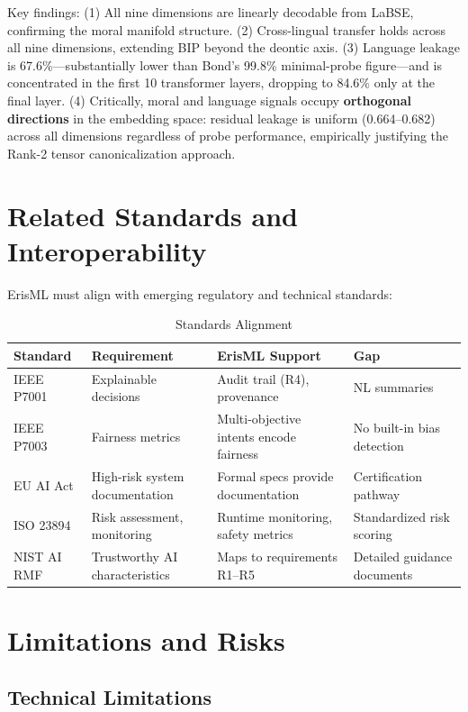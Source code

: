 \documentclass[conference]{IEEEtran}
\begin{document}
Key findings: (1) All nine dimensions are linearly decodable from LaBSE, confirming the moral manifold structure. (2) Cross-lingual transfer holds across all nine dimensions, extending BIP beyond the deontic axis. (3) Language leakage is 67.6\%---substantially lower than Bond's 99.8\% minimal-probe figure---and is concentrated in the first 10 transformer layers, dropping to 84.6\% only at the final layer. (4) Critically, moral and language signals occupy \textbf{orthogonal directions} in the embedding space: residual leakage is uniform (0.664--0.682) across all dimensions regardless of probe performance, empirically justifying the Rank-2 tensor canonicalization approach.

\section{Related Standards and Interoperability}
\label{sec:standards}

ErisML must align with emerging regulatory and technical standards:

\begin{table}[t]
\caption{Standards Alignment}
\label{tab:standards}
\centering
\footnotesize
\begin{tabular}{@{}p{1.4cm}p{1.6cm}p{2.2cm}p{1.4cm}@{}}
\toprule
Standard & Requirement & ErisML Support & Gap \\
\midrule
IEEE P7001 & Explainable decisions & Audit trail (R4), provenance & NL summaries \\
IEEE P7003 & Fairness metrics & Multi-objective intents encode fairness & No built-in bias detection \\
EU AI Act & High-risk system documentation & Formal specs provide documentation & Certification pathway \\
ISO 23894 & Risk assessment, monitoring & Runtime monitoring, safety metrics & Standardized risk scoring \\
NIST AI RMF & Trustworthy AI characteristics & Maps to requirements R1--R5 & Detailed guidance documents \\
\bottomrule
\end{tabular}
\end{table}

\section{Limitations and Risks}
\label{sec:limitations}

\subsection{Technical Limitations}
\end{document}
